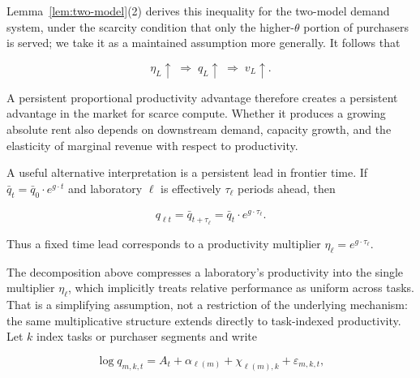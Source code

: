 \documentclass[11pt]{article}
\begin{document}
Lemma~\ref{lem:two-model}(2) derives this inequality for the two-model demand system, under the scarcity condition that only the higher-$\theta$ portion of purchasers is served; we take it as a maintained assumption more generally. It follows that

\begin{equation}\eta_L\uparrow\;\Longrightarrow\;q_L\uparrow\;\Longrightarrow\;v_L\uparrow.\end{equation}

A persistent proportional productivity advantage therefore creates a persistent advantage in the market for scarce compute. Whether it produces a growing absolute rent also depends on downstream demand, capacity growth, and the elasticity of marginal revenue with respect to productivity.

A useful alternative interpretation is a persistent lead in frontier time. If $\bar q_t=\bar q_0\cdot e^{g\cdot t}$ and laboratory $\ell$ is effectively $\tau_\ell$ periods ahead, then

\begin{equation}q_{\ell t}=\bar q_{t+\tau_\ell}=\bar q_t\cdot e^{g\cdot\tau_\ell}.\end{equation}

Thus a fixed time lead corresponds to a productivity multiplier $\eta_\ell=e^{g\cdot\tau_\ell}$.

The decomposition above compresses a laboratory's productivity into the single multiplier $\eta_\ell$, which implicitly treats relative performance as uniform across tasks. That is a simplifying assumption, not a restriction of the underlying mechanism: the same multiplicative structure extends directly to task-indexed productivity. Let $k$ index tasks or purchaser segments and write

\begin{equation}\log q_{m,k,t}=A_t+\alpha_{\ell(m)}+\chi_{\ell(m),k}+\varepsilon_{m,k,t},\end{equation}
\end{document}
